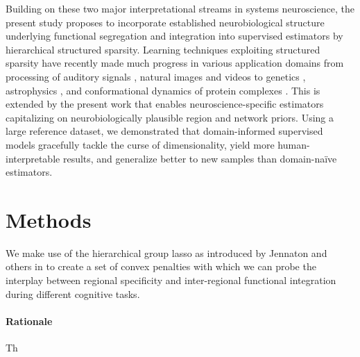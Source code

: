 \documentclass{article} %
\begin{document}
Building on these two major interpretational streams in systems neuroscience,
the present study proposes to incorporate
established neurobiological structure underlying
functional segregation and integration
into supervised estimators
by hierarchical structured sparsity.
%
Learning techniques
exploiting structured sparsity 
have recently made much progress in various application domains
from processing of auditory signals \cite{daudet2004sparse},
natural images \cite{harzallah2009combining} and
videos \cite{kang2015structured, kim2010sparse}
to
genetics \cite{rapaport2008classification, kim2012tree},
astrophysics \cite{vinci2014estimating},
and
conformational dynamics of protein complexes \cite{jenatton2009structured}.
%
This is extended by the present work that
enables neuroscience-specific estimators capitalizing on
neurobiologically plausible region and network priors.
%
Using a large reference dataset,
we demonstrated that domain-informed supervised models
gracefully tackle the curse of dimensionality,
yield more human-interpretable results,
and generalize better to new samples
than domain-na\"ive estimators.



\section{Methods}
We make use of the hierarchical group lasso as introduced by Jennaton and 
others in \cite{jenatton2011structured} to create a set of convex penalties
with which we can probe the interplay between regional specificity and 
inter-regional functional integration during different cognitive tasks.
%
\paragraph{Rationale}
Th
\end{document}
